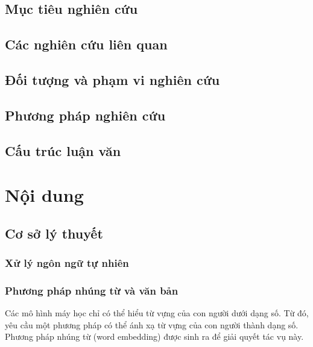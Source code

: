 \documentclass[a4paper, 12pt, openany]{book}
\begin{document}
\section{Mục tiêu nghiên cứu}

\section{Các nghiên cứu liên quan}

\section{Đối tượng và phạm vi nghiên cứu}

\section{Phương pháp nghiên cứu}

\section{Cấu trúc luận văn}


\chapter{Nội dung}

\section{Cơ sở lý thuyết}
\subsection{Xử lý ngôn ngữ tự nhiên}

\subsection{Phương pháp nhúng từ và văn bản}

Các mô hình máy học chỉ có thể hiểu từ vựng của con người dưới dạng số. Từ đó, yêu cầu một phương pháp có thể
ánh xạ từ vựng của con người thành dạng số. Phương pháp nhúng từ (word embedding)
được sinh ra để giải quyết tác vụ này.
\end{document}
